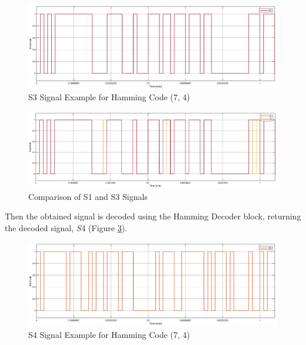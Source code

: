 \begin{refsection}
\begin{figure}[h!]
	\centering
	\includegraphics[width=.9\linewidth]{./sdf/eit_25828_hamming_channel_encoder_decoder/images/S3.png}
	\vspace{-3mm}
	\caption{S3 Signal Example for Hamming Code (7, 4)}
	\label{fig:hammingEncoderDecoder_S3}
\end{figure}

\begin{figure}[h!]
	\centering
	\includegraphics[width=.9\linewidth]{./sdf/eit_25828_hamming_channel_encoder_decoder/images/S1_S3.png}
	\vspace{-3mm}
	\caption{Comparison of S1 and S3 Signals}
	\label{fig:hammingEncoderDecoder_S1_S3}
\end{figure}

Then the obtained signal is decoded using the Hamming Decoder block, returning the decoded signal, $S4$ (Figure \ref{fig:hammingEncoderDecoder_S4}).

\begin{figure}[h!]
	\centering
	\includegraphics[width=.9\linewidth]{./sdf/eit_25828_hamming_channel_encoder_decoder/images/S4.png}
	\vspace{-3mm}
	\caption{S4 Signal Example for Hamming Code (7, 4)}
	\label{fig:hammingEncoderDecoder_S4}
\end{figure}


\end{refsection}
